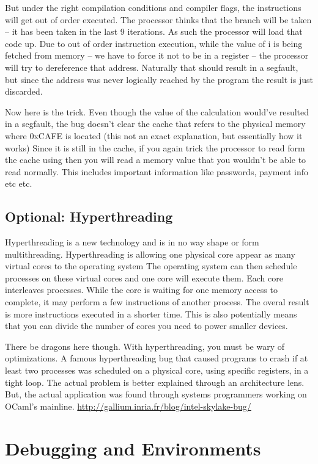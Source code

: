 But under the right compilation conditions and compiler flags, the instructions will get out of order executed. The processor thinks that the branch will be taken -- it has been taken in the last 9 iterations.
As such the processor will load that code up.
Due to out of order instruction execution, while the value of i is being fetched from memory -- we have to force it not to be in a register -- the processor will try to dereference that address.
Naturally that should result in a segfault, but since the address was never logically reached by the program the result is just discarded.

Now here is the trick.
Even though the value of the calculation would've resulted in a segfault, the bug doesn't clear the cache that refers to the physical memory where 0xCAFE is located (this not an exact explanation, but essentially how it works)
Since it is still in the cache, if you again trick the processor to read form the cache using  then you will read a memory value that you wouldn't be able to read normally.
This includes important information like passwords, payment info etc etc.

\subsection{Optional: Hyperthreading}

Hyperthreading is a new technology and is in no way shape or form multithreading. Hyperthreading is allowing one physical core appear as many virtual cores to the operating system
The operating system can then schedule processes on these virtual cores and one core will execute them.
Each core interleaves processes.
While the core is waiting for one memory access to complete, it may perform a few instructions of another process.
The overal result is more instructions executed in a shorter time.
This is also potentially means that you can divide the number of cores you need to power smaller devices.

There be dragons here though.
With hyperthreading, you must be wary of optimizations.
A famous hyperthreading bug that caused programs to crash if at least two processes was scheduled on a physical core, using specific registers, in a tight loop.
The actual problem is better explained through an architecture lens.
But, the actual application was found through systems programmers working on OCaml's mainline.
\url{http://gallium.inria.fr/blog/intel-skylake-bug/}

\section{Debugging and Environments}

